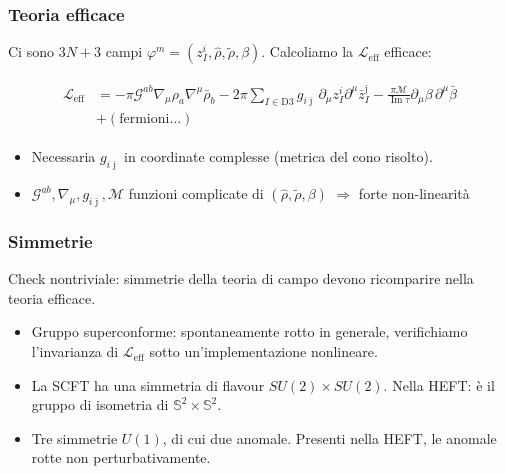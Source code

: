 \documentclass[aspectratio=43,mathserif]{beamer}
\newcommand{\ess}{\mathbb{S}}
\newcommand{\ssn}{\mathcal{N}}
\newcommand{\hatt}[1]{\ensuremath{\widehat{#1}}}
\newcommand{\tildd}[1]{\ensuremath{\widetilde{#1}}}
\renewcommand{\Im}{\ensuremath{\operatorname{Im}}}
\newcommand{\leff}{\ensuremath{\mathcal{L}_\text{eff}}}
\begin{document}
\begin{frame}
	\frametitle{Teoria efficace}
	Ci sono $3N+3$ campi $\varphi^m = (z_I^i, \hatt\rho, \tildd\rho, \beta)$. Calcoliamo la $\leff$ efficace:

	\begin{align}
		\begin{split}
			\leff &= - \pi \mathcal{G}^{ab} \nabla_\mu \rho_a \nabla^\mu \bar\rho_b - 2\pi \sum_{I\in \text{D3}} g_{i\bar\jmath}\, \partial_\mu z_I^i \partial^\mu \bar z_I^{\bar\jmath} - \frac{\pi\mathcal{M}}{\Im \tau} \partial_\mu \beta \,\partial^\mu \bar\beta\\
		&+ \left( \text{fermioni}\ldots \right)
	\end{split}
	\end{align}

	\begin{itemize}
		\item Necessaria $g_{i\bar\jmath}$ in coordinate complesse (metrica del cono risolto).
		\item $\mathcal{G}^{ab},\nabla_\mu,g_{i\bar\jmath},\mathcal{M}$ funzioni complicate di $(\hatt\rho,\tildd\rho,\beta)$ $\Longrightarrow$ forte non-linearità
	\end{itemize}



\end{frame}


\begin{frame}
	\frametitle{Simmetrie}
	Check nontriviale: simmetrie della teoria di campo devono ricomparire nella teoria efficace. 
	\begin{itemize}
		\vfill\item Gruppo superconforme: spontaneamente rotto in generale, verifichiamo l'invarianza di $\leff$ sotto un'implementazione nonlineare.
		\vfill\item La SCFT ha una simmetria di flavour $SU(2)\times SU(2)$. Nella HEFT: è il gruppo di isometria di $\ess^2 \times \ess^2$.
		\vfill\item Tre simmetrie $U(1)$, di cui due anomale. Presenti nella HEFT, le anomale rotte non perturbativamente.
	\end{itemize}
\end{frame}
\end{document}
